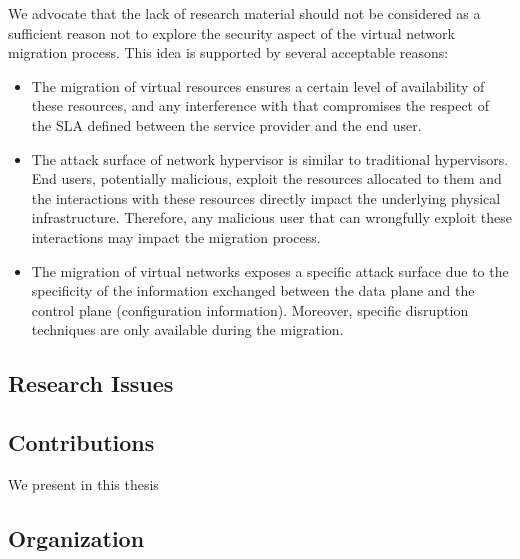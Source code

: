 We advocate that the lack of research material should not be considered as a sufficient reason not to explore the security aspect of the virtual network migration process. This idea is supported by several acceptable reasons:

\begin{itemize}
    
    \item The migration of virtual resources ensures a certain level of availability of these resources, and any interference with that compromises the respect of the SLA defined between the service provider and the end user.
    
    \item The attack surface of network hypervisor is similar to traditional hypervisors. End users, potentially malicious, exploit the resources allocated to them and the interactions with these resources directly impact the underlying physical infrastructure. Therefore, any malicious user that can wrongfully exploit these interactions may impact the migration process.

    \item The migration of virtual networks exposes a specific attack surface due to the specificity of the information exchanged between the data plane and the control plane (\eg configuration information). Moreover, specific disruption techniques are only available during the migration.  
    
\end{itemize}

\subsection{Research Issues}

\subsection{Contributions}
We present in this thesis  


\subsection{Organization}